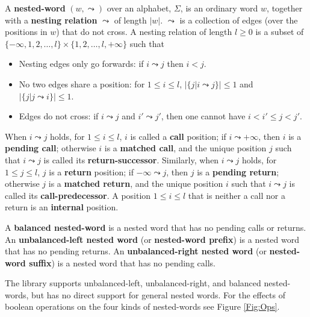\documentclass{llncs}
\begin{document}
\begin{definition}
\label{De:nested word}
A \textbf{nested-word} $(w,\leadsto)$ over an alphabet, $\Sigma$, is an ordinary word $w$, together with a \textbf{nesting relation} $\leadsto$ of length $|w|$.  $\leadsto$ is a collection of edges (over the positions in $w$) that do not cross.  A nesting relation of length $l \geq 0$ is a subset of $\{-\infty,1,2,\ldots,l\} \times \{1,2,\ldots,l,+\infty\}$ such that 
\begin{itemize}
	\item
	 Nesting edges only go forwards: if $i \leadsto j$ then $i < j$.

	 \item
	  No two edges share a position: for $1 \leq i \leq l$, $|\{j | i \leadsto j \}| \leq 1$ and $|\{ j | j \leadsto i \}| \leq 1$.

	  \item
	  Edges do not cross: if $i \leadsto j$ and $i' \leadsto j'$, then one cannot have $i < i' \leq j < j'$.

\end{itemize}
When $i \leadsto j$ holds, for $1 \leq i \leq l$, $i$ is called a \textbf{call} position; if $i \leadsto +\infty$, then $i$ is a \textbf{pending call}; otherwise $i$ is a \textbf{matched call}, and the unique position $j$ such that $i \leadsto j$ is called its \textbf{return-successor}.  Similarly, when $i \leadsto j$ holds, for $1 \leq j \leq l$, $j$ is a \textbf{return} position; if $-\infty \leadsto j$, then $j$ is a \textbf{pending return}; otherwise $j$ is a \textbf{matched return}, and the unique position $i$ such that $i \leadsto j$ is called its \textbf{call-predecessor}.  A position $1 \leq i \leq l$ that is neither a call nor a return is an \textbf{internal} position.

A \textbf{balanced nested-word} is a nested word that has no pending calls or returns.  An \textbf{unbalanced-left nested word} (or \textbf{nested-word prefix}) is a nested word that has no pending returns.  An \textbf{unbalanced-right nested word} (or \textbf{nested-word suffix}) is a nested word that has no pending calls.
\end{definition}

The library supports unbalanced-left, unbalanced-right, and balanced nested-words, but has no direct support for general nested words.  For the effects of boolean operations on the four kinds of nested-words see Figure \ref{Fig:Ops}.
\end{document}
